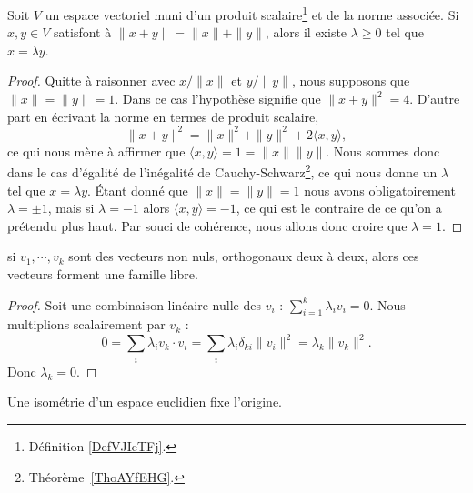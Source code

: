 \begin{lemma}   \label{LemLPOHUme}
    Soit \( V\) un espace vectoriel muni d'un produit scalaire\footnote{Définition \ref{DefVJIeTFj}.} et de la norme associée. Si \( x,y\in V\) satisfont à \( \| x+y \|=\| x \|+\| y \|\), alors il existe \( \lambda\geq 0\) tel que \( x=\lambda y\).
\end{lemma}

\begin{proof}
    Quitte à raisonner avec \( x/\| x \|\) et \( y/\| y \|\), nous supposons que \( \| x \|=\| y \|=1\). Dans ce cas l'hypothèse signifie que \( \| x+y \|^2=4\). D'autre part en écrivant la norme en termes de produit scalaire,
    \begin{equation}
        \| x+y \|^2=\| x \|^2+\| y \|^2+2\langle x, y\rangle ,
    \end{equation}
    ce qui nous mène à affirmer que \( \langle x, y\rangle =1=\| x \|\| y \|\). Nous sommes donc dans le cas d'égalité de l'inégalité de Cauchy-Schwarz\footnote{Théorème~\ref{ThoAYfEHG}.}, ce qui nous donne un \( \lambda\) tel que \( x=\lambda y\). Étant donné que \( \| x \|=\| y \|=1\) nous avons obligatoirement \( \lambda=\pm 1\), mais si \( \lambda=-1\) alors \( \langle x, y\rangle =-1\), ce qui est le contraire de ce qu'on a prétendu plus haut. Par souci de cohérence, nous allons donc croire que \( \lambda=1\).
\end{proof}

\begin{proposition}     \label{PropVectsOrthLibres}
    si $v_1,\cdots,v_k$ sont des vecteurs non nuls, orthogonaux deux à deux, alors ces vecteurs forment une famille libre.
\end{proposition}

\begin{proof}
    Soit une combinaison linéaire nulle des \( v_i\) : \( \sum_{i=1}^k\lambda_iv_i=0\). Nous multiplions scalairement par \( v_k\) :
    \begin{equation}
        0=\sum_i\lambda_iv_k\cdot v_i=\sum_i\lambda_i\delta_{ki}\| v_i \|^2=\lambda_k\| v_k \|^2.
    \end{equation}
    Donc \( \lambda_k=0\).
\end{proof}

\begin{lemma}       \label{LEMooYXJZooWKRFRu}
    Une isométrie d'un espace euclidien fixe l'origine.
\end{lemma}

